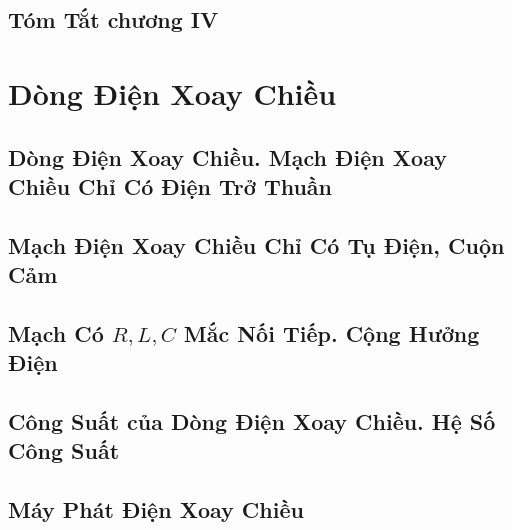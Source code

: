 \documentclass{article}
\numberwithin{equation}{section}
\begin{document}

\subsection{Tóm Tắt chương IV}


\section{Dòng Điện Xoay Chiều}

\subsection{Dòng Điện Xoay Chiều. Mạch Điện Xoay Chiều Chỉ Có Điện Trở Thuần}


\subsection{Mạch Điện Xoay Chiều Chỉ Có Tụ Điện, Cuộn Cảm}


\subsection{Mạch Có $R,L,C$ Mắc Nối Tiếp. Cộng Hưởng Điện}


\subsection{Công Suất của Dòng Điện Xoay Chiều. Hệ Số Công Suất}


\subsection{Máy Phát Điện Xoay Chiều}

\end{document}
